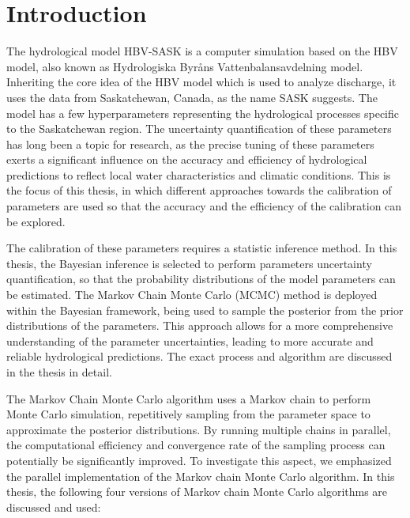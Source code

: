 \chapter{Introduction}

The hydrological model HBV-SASK is a computer simulation based on the HBV model, also known as Hydrologiska Byråns Vattenbalansavdelning model. Inheriting the core idea of the HBV model which is used to analyze discharge,\cite{hbv_intro} it uses the data from Saskatchewan, Canada, as the name SASK suggests. The model has a few hyperparameters representing the hydrological processes specific to the Saskatchewan region.\cite{hydrology} The uncertainty quantification of these parameters has long been a topic for research, as the precise tuning of these parameters exerts a significant influence on the accuracy and efficiency of hydrological predictions to reflect local water characteristics and climatic conditions.\cite{hbv_calibration_intro} This is the focus of this thesis, in which different approaches towards the calibration of parameters are used so that the accuracy and the efficiency of the calibration can be explored.

The calibration of these parameters requires a statistic inference method. In this thesis, the Bayesian inference is selected to perform parameters uncertainty quantification, so that the probability distributions of the model parameters can be estimated.\cite{bayesian_uq_intro} The Markov Chain Monte Carlo (MCMC) method is deployed within the Bayesian framework, being used to sample the posterior from the prior distributions of the parameters. This approach allows for a more comprehensive understanding of the parameter uncertainties, leading to more accurate and reliable hydrological predictions.\cite{mcmc_practice} The exact process and algorithm are discussed in the thesis in detail.

The Markov Chain Monte Carlo algorithm uses a Markov chain to perform Monte Carlo simulation, repetitively sampling from the parameter space to approximate the posterior distributions. By running multiple chains in parallel, the computational efficiency and convergence rate of the sampling process can potentially be significantly improved. To investigate this aspect, we emphasized the parallel implementation of the Markov chain Monte Carlo algorithm. In this thesis, the following four versions of Markov chain Monte Carlo algorithms are discussed and used:

